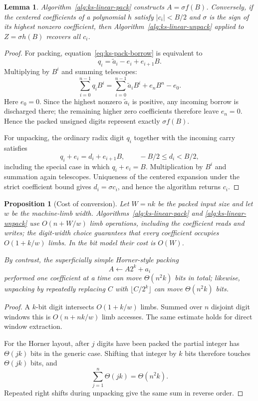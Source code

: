 \documentclass[11pt]{book}
\newtheorem{lemma}[theorem]{Lemma}
\newtheorem{proposition}[theorem]{Proposition}
\theoremstyle{definition}
\begin{document}
\begin{lemma}\label{lem:ks-linear-pack-correct}
Algorithm~\ref{alg:ks-linear-pack} constructs $A=\sigma f(B)$.  Conversely,
if the centered coefficients of a polynomial $h$ satisfy $|c_i|<B/2$ and
$\sigma$ is the sign of its highest nonzero coefficient, then
Algorithm~\ref{alg:ks-linear-unpack} applied to $Z=\sigma h(B)$ recovers all
$c_i$.
\end{lemma}

\begin{proof}
For packing, equation~\eqref{eq:ks-pack-borrow} is equivalent to
\[
 q_i=\widetilde a_i-e_i+e_{i+1}B.
\]
Multiplying by $B^i$ and summing telescopes:
\[
 \sum_{i=0}^{n-1}q_iB^i
 =\sum_{i=0}^{n-1}\widetilde a_iB^i+e_nB^n-e_0.
\]
Here $e_0=0$.  Since the highest nonzero $\widetilde a_i$ is positive, any
incoming borrow is discharged there; the remaining higher zero coefficients
therefore leave $e_n=0$.  Hence the packed unsigned digits represent exactly
$\sigma f(B)$.

For unpacking, the ordinary radix digit $q_i$ together with the incoming carry
satisfies
\[
 q_i+e_i=d_i+e_{i+1}B,
 \qquad -B/2\leq d_i<B/2,
\]
including the special case in which $q_i+e_i=B$.  Multiplication by $B^i$ and
summation again telescopes.  Uniqueness of the centered expansion under the
strict coefficient bound gives $d_i=\sigma c_i$, and hence the algorithm
returns $c_i$.
\end{proof}

\begin{proposition}[Cost of conversion]\label{prop:ks-linear-conversion}
Let $W=nk$ be the packed input size and let $w$ be the machine-limb width.
Algorithms~\ref{alg:ks-linear-pack} and \ref{alg:ks-linear-unpack} use
$O(n+W/w)$ limb operations, including the coefficient reads and writes; the
digit-width choice guarantees that every coefficient occupies $O(1+k/w)$
limbs.  In the bit model their cost is $O(W)$.

By contrast, the superficially simple Horner-style packing
\[
 A\leftarrow A2^k+a_i
\]
performed one coefficient at a time can move $\Theta(n^2k)$ bits in total;
likewise, unpacking by repeatedly replacing
$C$ with $\lfloor C/2^k\rfloor$ can move $\Theta(n^2k)$ bits.
\end{proposition}

\begin{proof}
A $k$-bit digit intersects $O(1+k/w)$ limbs.  Summed over $n$ disjoint digit
windows this is $O(n+nk/w)$ limb accesses.  The same estimate holds for direct
window extraction.

For the Horner layout, after $j$ digits have been packed the partial integer
has $\Theta(jk)$ bits in the generic case.  Shifting that integer by $k$ bits
therefore touches $\Theta(jk)$ bits, and
\[
 \sum_{j=1}^{n}\Theta(jk)=\Theta(n^2k).
\]
Repeated right shifts during unpacking give the same sum in reverse order.
\end{proof}
\end{document}
